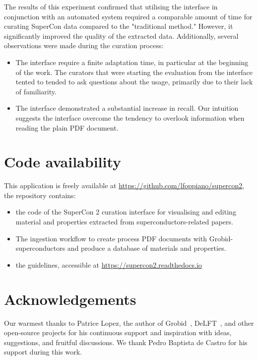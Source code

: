 \documentclass[a4paper]{article}
\begin{document}
The results of this experiment confirmed that utilising the interface in conjunction with an automated system required a comparable amount of time for curating SuperCon data compared to the "traditional method." However, it significantly improved the quality of the extracted data.
Additionally, several observations were made during the curation process:

\begin{itemize}
    \item The interface require a finite adaptation time, in particular at the beginning of the work. The curators that were starting the evaluation from the interface tented to tended to ask questions about the usage, primarily due to their lack of familiarity. 
    \item The interface demonstrated a substantial increase in recall. Our intuition suggests the interface overcome the tendency to overlook information when reading the plain PDF document.
\end{itemize}


\section{Code availability}
This application is freely available at \url{https://github.com/lfoppiano/supercon2}, the repository contains:
\begin{itemize}
\item the code of the SuperCon 2 curation interface for visualising and editing material and properties extracted from superconductors-related papers.
\item The ingestion workflow to create process PDF documents with Grobid-superconductors and produce a database of materials and properties.
\item the guidelines, accessible at \url{https://supercon2.readthedocs.io}
\end{itemize}

\section{Acknowledgements}
Our warmest thanks to Patrice Lopez, the author of Grobid~\cite{GROBID}, DeLFT~\cite{DeLFT}, and other open-source projects for his continuous support and inspiration with ideas, suggestions, and fruitful discussions.
We thank Pedro Baptista de Castro for his support during this work. 
\end{document}
